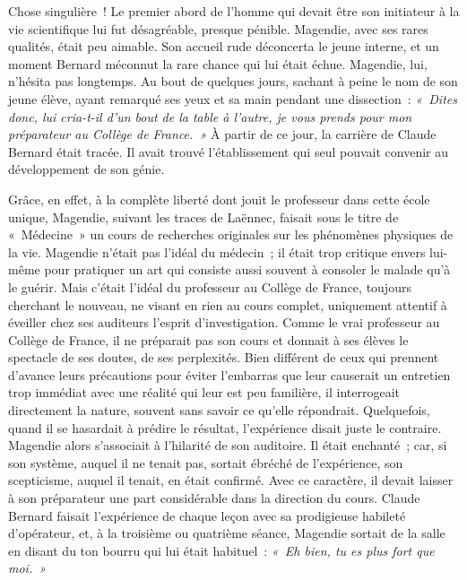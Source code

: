 \documentclass[french,twoside]{book} %
\newcommand\orgName[1]{#1}
\newcommand\persName[1]{#1}
\begin{document}
Chose singulière ! Le premier abord de l’homme qui devait être son initiateur à la vie scientifique lui fut désagréable, presque pénible. {\persName Magendie}, avec ses rares qualités, était peu aimable. Son accueil rude déconcerta le jeune interne, et un moment {\persName Bernard} méconnut la rare chance qui lui était échue. {\persName Magendie}, lui, n’hésita pas longtemps. Au bout de quelques jours, sachant à peine le nom de son jeune élève, ayant remarqué ses yeux et sa main pendant une dissection : \emph{« Dites donc, lui cria-t-il d’un bout de la table à l’autre, je vous prends pour mon préparateur au {\orgName Collège de France}. »} À partir de ce jour, la carrière de {\persName Claude Bernard} était tracée. Il avait trouvé l’établissement qui seul pouvait convenir au développement de son génie.\par
Grâce, en effet, à la complète liberté dont jouit le professeur dans cette école unique, {\persName Magendie}, suivant les traces de {\persName Laënnec}, faisait sous le titre de « Médecine » un cours de recherches originales sur les phénomènes physiques de la vie. {\persName Magendie} n’était pas l’idéal du médecin ; il était trop critique envers lui-même pour pratiquer un art qui consiste aussi souvent à consoler le malade qu’à le guérir. Mais c’était l’idéal du professeur au {\orgName Collège de France}, toujours cherchant le nouveau, ne visant en rien au cours complet, uniquement attentif à éveiller chez ses auditeurs l’esprit d’investigation. Comme le vrai professeur au {\orgName Collège de France}, il ne préparait pas son cours et donnait à ses élèves le spectacle de ses doutes, de ses perplexités. Bien différent de ceux qui prennent d’avance leurs précautions pour éviter l’embarras que leur causerait un entretien trop immédiat avec une réalité qui leur est peu familière, il interrogeait directement la nature, souvent sans savoir ce qu’elle répondrait. Quelquefois, quand il se hasardait à prédire le résultat, l’expérience disait juste le contraire. {\persName Magendie} alors s’associait à l’hilarité de son auditoire. Il était enchanté ; car, si son système, auquel il ne tenait pas, sortait ébréché de l’expérience, son scepticisme, auquel il tenait, en était confirmé. Avec ce caractère, il devait laisser à son préparateur une part considérable dans la direction du cours. {\persName Claude Bernard} faisait l’expérience de chaque leçon avec sa prodigieuse habileté d’opérateur, et, à la troisième ou quatrième séance, {\persName Magendie} sortait de la salle en disant du ton bourru qui lui était habituel : \emph{« Eh bien, tu es plus fort que moi. »}\par
\end{document}
